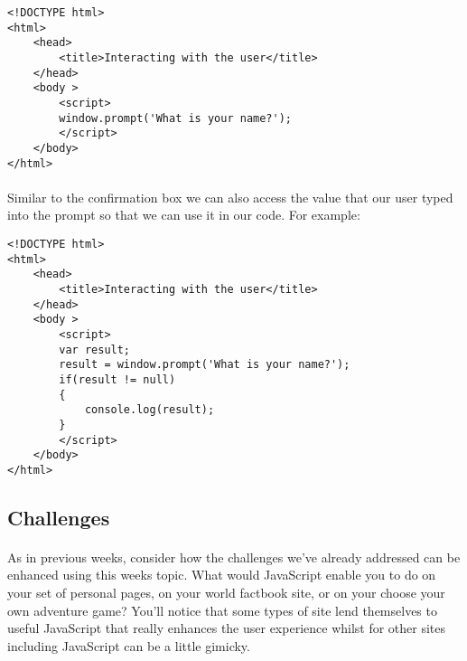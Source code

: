 \documentclass[10pt, a4paper, twosize]{article}
\begin{document}
\begin{lstlisting}
<!DOCTYPE html>
<html>
    <head>
        <title>Interacting with the user</title>
    </head>
    <body >
        <script>
        window.prompt('What is your name?');    
        </script>
    </body>
</html>
\end{lstlisting}

\paragraph{} Similar to the confirmation box we can also access the value that our user typed into the prompt so that we can use it in our code. For example:

\begin{lstlisting}
<!DOCTYPE html>
<html>
    <head>
        <title>Interacting with the user</title>
    </head>
    <body >
        <script>
        var result;
        result = window.prompt('What is your name?');
        if(result != null)
        {   
            console.log(result);
        }
        </script>
    </body>
</html>
\end{lstlisting}


\subsection{Challenges}
\paragraph{} As in previous weeks, consider how the challenges we've already addressed can be enhanced using this weeks topic. What would JavaScript enable you to do on your set of personal pages, on your world factbook site, or on your choose your own adventure game? You'll notice that some types of site lend themselves to useful JavaScript that really enhances the user experience whilst for other sites including JavaScript can be a little gimicky.
\end{document}
